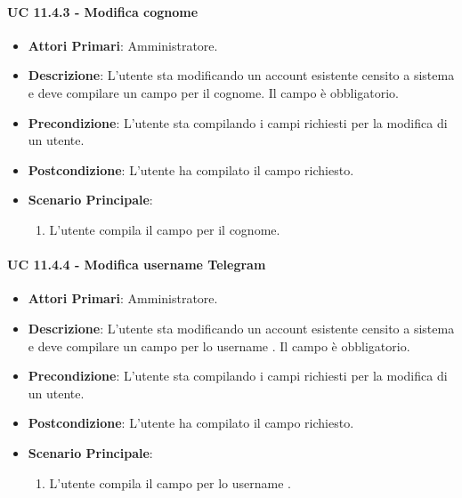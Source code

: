 				\paragraph{UC 11.4.3 - Modifica cognome}
				\begin{itemize}
					\item \textbf{Attori Primari}: Amministratore.
					\item \textbf{Descrizione}: L'utente sta modificando un account esistente censito a sistema e deve compilare un campo per il cognome. Il campo è obbligatorio.
					\item \textbf{Precondizione}: L'utente sta compilando i campi richiesti per la modifica di un utente.
					\item \textbf{Postcondizione}: L'utente ha compilato il campo richiesto.
					\item \textbf{Scenario Principale}:
					\begin{enumerate}
						\item{L'utente compila il campo per il cognome.}
					\end{enumerate}	
				\end{itemize}

				\paragraph{UC 11.4.4 - Modifica username Telegram}
				\begin{itemize}
					\item \textbf{Attori Primari}: Amministratore.
					\item \textbf{Descrizione}: L'utente sta modificando un account esistente censito a sistema e deve compilare un campo per lo username . Il campo è obbligatorio.
					\item \textbf{Precondizione}: L'utente sta compilando i campi richiesti per la modifica di un utente.
					\item \textbf{Postcondizione}: L'utente ha compilato il campo richiesto.
					\item \textbf{Scenario Principale}:
					\begin{enumerate}
						\item{L'utente compila il campo per lo username .}
					\end{enumerate}	
				\end{itemize}

